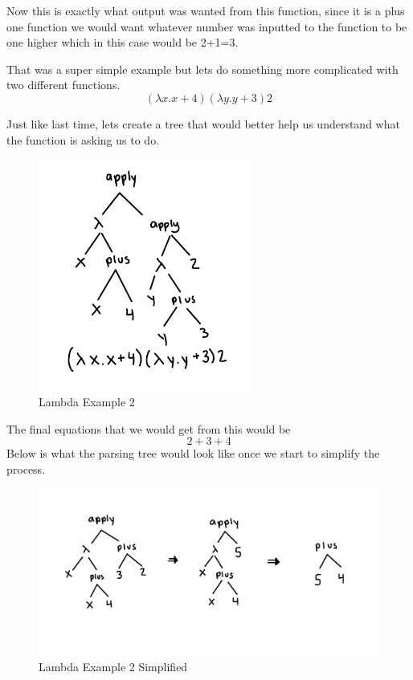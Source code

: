 \documentclass{article}
\begin{document}
\medskip\noindent
Now this is exactly what output was wanted from this function, since it is a plus one function we would want whatever number was inputted to the function to be one higher which in this case would be 2+1=3.

\medskip\noindent
That was a super simple example but lets do something more complicated with two different functions.
$$ (\lambda x.x+4)(\lambda y.y+3)2$$

\medskip\noindent
Just like last time, lets create a tree that would better help us understand what the function is asking us to do. 

\medskip\noindent 
\begin{figure}[htp]
    \centering
    \includegraphics[width=7cm]{LambdaEx2.jpg}
    \caption{Lambda Example 2}
    \label{fig:Lambda Example 2}
\end{figure}
\cite{LFG}

\medskip\noindent
The final equations that we would get from this would be $$2+3+4$$ Below is what the parsing tree would look like once we start to simplify the process. 

\medskip\noindent 
\begin{figure}[htp]
    \centering
    \includegraphics[width=16cm]{Example2Simplified.jpg}
    \caption{Lambda Example 2 Simplified}
    \label{fig:Lambda Example 2 Simplified}
\end{figure}
\end{document}
